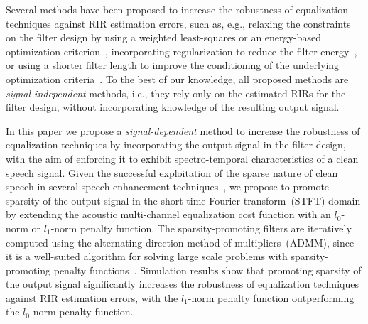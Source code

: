 \documentclass{article}
\begin{document}
Several methods have been proposed to increase the robustness of equalization techniques against RIR estimation errors, such as, e.g., relaxing the constraints on the filter design by using a weighted least-squares or an energy-based optimization criterion~\cite{Kallinger_ICASSP_2006,Lim_ITASLP_2014}, incorporating regularization to reduce the filter energy~\cite{Hikichi_EURASIP_2007,Kodrasi_ITASLP_2013}, or using a shorter filter length to improve the conditioning of the underlying optimization criteria~\cite{Kodrasi_EUSIPCO_2012}.
To the best of our knowledge, all proposed methods are {\textit{signal-independent}} methods, i.e., they rely only on the estimated RIRs for the filter design, without incorporating knowledge of the resulting output signal.

In this paper we propose a {\textit{signal-dependent}} method to increase the robustness of equalization techniques by incorporating the output signal in the filter design, with the aim of enforcing it to exhibit spectro-temporal characteristics of a clean speech signal.
Given the successful exploitation of the sparse nature of clean speech in several speech enhancement techniques~\cite{makino_2010,Kameoka_ICASSP_2009,vanwaterschoot13-122,Jukic_ITASLP_2015}, we propose to promote sparsity of the output signal in the short-time Fourier transform~(STFT) domain by extending the acoustic multi-channel equalization cost function with an $l_0$-norm or $l_1$-norm penalty function.
The sparsity-promoting filters are iteratively computed using the alternating direction method of multipliers~(ADMM), since it is a well-suited algorithm for solving large scale problems with sparsity-promoting penalty functions~\cite{Boyd_admm_2011}.
Simulation results show that promoting sparsity of the output signal significantly increases the robustness of equalization techniques against RIR estimation errors, with the $l_1$-norm penalty function outperforming the $l_0$-norm penalty function.
\end{document}

